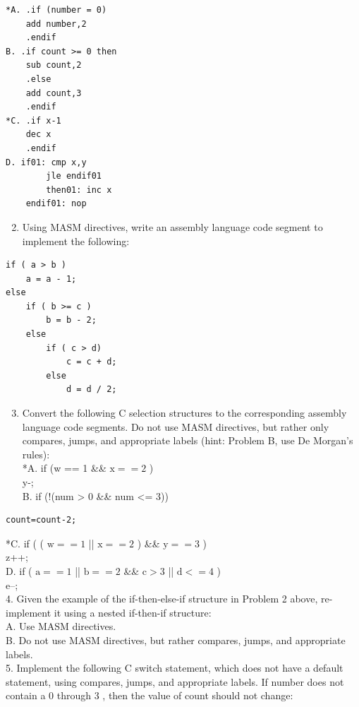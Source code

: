 \documentclass[10pt]{article}
\begin{document}
\begin{verbatim}
*A. .if (number = 0)
    add number,2
    .endif
B. .if count >= 0 then
    sub count,2
    .else
    add count,3
    .endif
*C. .if x-1
    dec x
    .endif
D. if01: cmp x,y
        jle endif01
        then01: inc x
    endif01: nop
\end{verbatim}

\begin{enumerate}
  \setcounter{enumi}{1}
  \item Using MASM directives, write an assembly language code segment to implement the following:
\end{enumerate}

\begin{verbatim}
if ( a > b )
    a = a - 1;
else
    if ( b >= c )
        b = b - 2;
    else
        if ( c > d)
            c = c + d;
        else
            d = d / 2;
\end{verbatim}

\begin{enumerate}
  \setcounter{enumi}{2}
  \item Convert the following C selection structures to the corresponding assembly language code segments. Do not use MASM directives, but rather only compares, jumps, and appropriate labels (hint: Problem B, use De Morgan's rules):\\
*A. if (w == 1 \&\& $\mathrm{x}==2$ )\\
y-;\\
B. if (!(num > 0 \&\& num <= 3))
\end{enumerate}

\begin{verbatim}
count=count-2;
\end{verbatim}

*C. if ( ( $\mathrm{w}==1$ || $\mathrm{x}==2$ ) \&\& $\mathrm{y}==3$ )\\
z++;\\
D. if ( $\mathrm{a}==1$ || $\mathrm{b}==2$ \&\& $\mathrm{c}>3$ || $\mathrm{d}<=4$ )\\
e--;\\
4. Given the example of the if-then-else-if structure in Problem 2 above, re-implement it using a nested if-then-if structure:\\
A. Use MASM directives.\\
B. Do not use MASM directives, but rather compares, jumps, and appropriate labels.\\
5. Implement the following C switch statement, which does not have a default statement, using compares, jumps, and appropriate labels. If number does not contain a 0 through 3 , then the value of count should not change:
\end{document}
